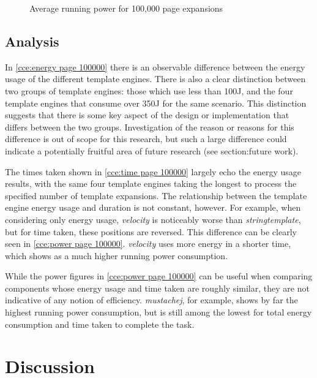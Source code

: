 \begin{figure}[htbp]
  \centering
  
  \caption{Average running power for 100,000 page expansions}
  \label{cce:power page 100000}
\end{figure}

\subsection{Analysis}
\label{cce analysis}

In \autoref{cce:energy page 100000} there is an observable difference between the energy usage of the different \gls{template engine}s. There is also a clear distinction between two groups of \gls{template engine}s: those which use less than 100J, and the four \gls{template engine}s that consume over 350J for the same scenario. This distinction suggests that there is some key aspect of the design or implementation that differs between the two groups. Investigation of the reason or reasons for this difference is out of scope for this research, but such a large difference could indicate a potentially fruitful area of future research (see section:future work).

The times taken shown in \autoref{cce:time page 100000} largely echo the energy usage results, with the same four \gls{template engine}s taking the longest to process the specified number of template expansions. The relationship between the \gls{template engine} energy usage and duration is not constant, however. For example, when considering only energy usage, \emph{velocity} is noticeably worse than \emph{stringtemplate}, but for time taken, these positions are reversed. This difference can be clearly seen in \autoref{cce:power page 100000}. \emph{velocity} uses more energy in a shorter time, which shows as a much higher running power consumption.

While the power figures in \autoref{cce:power page 100000} can be useful when comparing components whose energy usage and time taken are roughly similar, they are not indicative of any notion of efficiency. \emph{mustachej}, for example, shows by far the highest running power consumption, but is still among the lowest for total energy consumption and time taken to complete the task.

\section{Discussion}
\label{ce duscussion}

